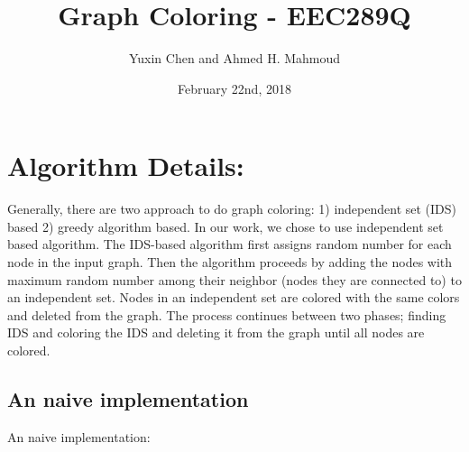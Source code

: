 \documentclass[12pt] {article}
\begin{document}
\title{Graph Coloring -  EEC289Q}
\author{Yuxin Chen and Ahmed H. Mahmoud}
\date{February 22nd, 2018}
\maketitle

\section*{Algorithm Details:}
Generally, there are two approach to do graph coloring: 1) independent set (IDS) based 2) greedy algorithm based. In our work, we chose to use independent set based algorithm. %
The IDS-based algorithm first assigns random number for each node in the input graph. Then the algorithm proceeds by adding the nodes with maximum random number among their neighbor (nodes they are connected to) to an independent set. Nodes in an independent set are colored with the same colors and deleted from the graph. The process continues between two phases; finding IDS and coloring the IDS and deleting it from the graph until all nodes are colored. 

\subsection*{An naive implementation}
An naive implementation: 
\end{document}
